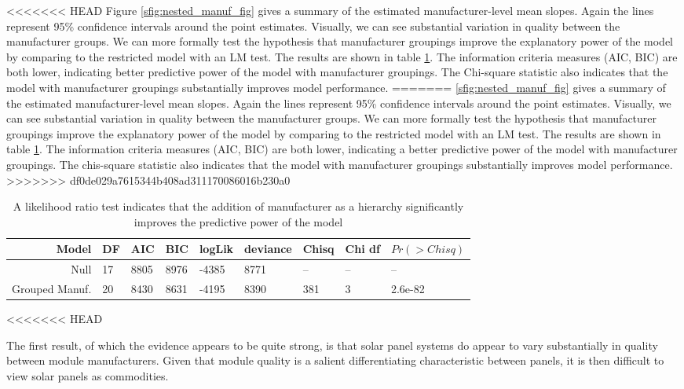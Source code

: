 \documentclass[12pt]{article}
\begin{document}
<<<<<<< HEAD
Figure \ref{sfig:nested_manuf_fig} gives a summary of the estimated manufacturer-level mean slopes. Again the lines represent 95\% confidence intervals around the point estimates. Visually, we can see substantial variation in quality between the manufacturer groups. We can more formally test the hypothesis that manufacturer groupings improve the explanatory power of the model by comparing to the restricted model with an LM test. The results are shown in table \ref{tbl:lm_commodity}. The information criteria measures (AIC, BIC) are both lower, indicating better predictive power of the model with manufacturer groupings. The Chi-square statistic also indicates that the model with manufacturer groupings substantially improves model performance.
=======
\ref{sfig:nested_manuf_fig} gives a summary of the estimated manufacturer-level mean slopes. Again the lines represent 95\% confidence intervals around the point estimates. Visually, we can see substantial variation in quality between the manufacturer groups. We can more formally test the hypothesis that manufacturer groupings improve the explanatory power of the model by comparing to the restricted model with an LM test. The results are shown in table \ref{tbl:lm_commodity}. The information criteria measures (AIC, BIC) are both lower, indicating a better predictive power of the model with manufacturer groupings. The chis-square statistic also indicates that the model with manufacturer groupings substantially improves model performance.
>>>>>>> df0de029a7615344b408ad311170086016b230a0

\begin{table}
  \begin{tabular}{rllllllll}
  \toprule
    Model &  DF &   AIC &   BIC &  logLik &  deviance &  Chisq &  Chi df &  $Pr(>Chisq)$ \\
    \midrule
             Null &  17 &  8805 &  8976 &   -4385 &      8771 &     -- &      -- &          -- \\
    Grouped Manuf. &  20 &  8430 &  8631 &   -4195 &      8390 &    381 &       3 &     2.6e-82 \\
  \bottomrule
  \end{tabular}
  \label{tbl:lm_commodity}
<<<<<<< HEAD
  \caption{A likelihood ratio test indicates that the addition of manufacturer as a hierarchy significantly improves the predictive power of the model}
\end{table}

The first result, of which the evidence appears to be quite strong, is that solar panel systems do appear to vary substantially in quality between module manufacturers. Given that module quality is a salient differentiating characteristic between panels, it is then difficult to view solar panels as commodities.
\end{document}
